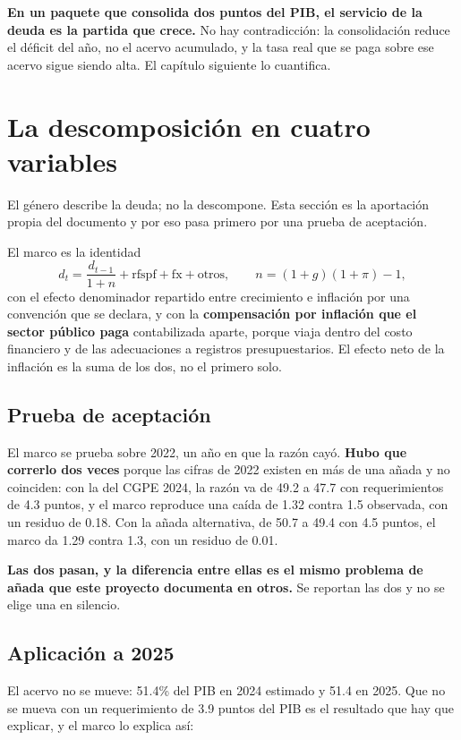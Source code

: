 \textbf{En un paquete que consolida dos puntos del PIB, el servicio de la deuda es
la partida que crece.} No hay contradicción: la consolidación reduce el déficit
del año, no el acervo acumulado, y la tasa real que se paga sobre ese acervo sigue
siendo alta. El capítulo siguiente lo cuantifica.

\section{La descomposición en cuatro variables}

El género describe la deuda; no la descompone. Esta sección es la aportación
propia del documento y por eso pasa primero por una prueba de aceptación.

El marco es la identidad
\[
d_t = \frac{d_{t-1}}{1+n} + \mathrm{rfspf} + \mathrm{fx} + \text{otros},
\qquad n = (1+g)(1+\pi) - 1,
\]
con el efecto denominador repartido entre crecimiento e inflación por una
convención que se declara, y con la \textbf{compensación por inflación que el
sector público paga} contabilizada aparte, porque viaja dentro del costo
financiero y de las adecuaciones a registros presupuestarios. El efecto neto de la
inflación es la suma de los dos, no el primero solo.



\subsection{Prueba de aceptación}

El marco se prueba sobre 2022, un año en que la razón cayó. \textbf{Hubo que
correrlo dos veces} porque las cifras de 2022 existen en más de una añada y no
coinciden: con la del CGPE 2024, la razón va de 49.2 a 47.7 con requerimientos de
4.3 puntos, y el marco reproduce una caída de 1.32 contra 1.5 observada, con un
residuo de 0.18. Con la añada alternativa, de 50.7 a 49.4 con 4.5 puntos, el marco
da 1.29 contra 1.3, con un residuo de 0.01.

\textbf{Las dos pasan, y la diferencia entre ellas es el mismo problema de añada
que este proyecto documenta en otros.} Se reportan las dos y no se elige una en
silencio.

\subsection{Aplicación a 2025}

El acervo no se mueve: 51.4\% del PIB en 2024 estimado y 51.4 en 2025. Que no se
mueva con un requerimiento de 3.9 puntos del PIB es el resultado que hay que
explicar, y el marco lo explica así:

